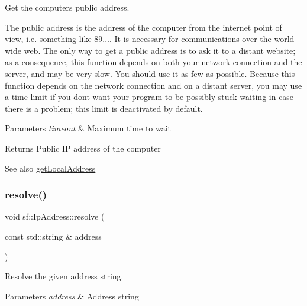 Get the computer\textquotesingle{}s public address. 

The public address is the address of the computer from the internet point of view, i.\+e. something like 89.... It is necessary for communications over the world wide web. The only way to get a public address is to ask it to a distant website; as a consequence, this function depends on both your network connection and the server, and may be very slow. You should use it as few as possible. Because this function depends on the network connection and on a distant server, you may use a time limit if you don\textquotesingle{}t want your program to be possibly stuck waiting in case there is a problem; this limit is deactivated by default.


\begin{DoxyParams}{Parameters}
{\em timeout} & Maximum time to wait\\
\hline
\end{DoxyParams}
\begin{DoxyReturn}{Returns}
Public IP address of the computer
\end{DoxyReturn}
\begin{DoxySeeAlso}{See also}
\mbox{\hyperlink{classsf_1_1_ip_address_a4c31622ad87edca48adbb8e8ed00ee4a}{get\+Local\+Address}} \begin{DoxyVerb}\end{DoxyVerb}
 
\end{DoxySeeAlso}
\mbox{\label{classsf_1_1_ip_address_aa6e114d1a8cb977aff6132d490e4a6b1}} 
\subsubsection{\texorpdfstring{resolve()}{resolve()}}
{\footnotesize\ttfamily void sf\+::\+Ip\+Address\+::resolve (\begin{DoxyParamCaption}\item[{const std\+::string \&}]{address }\end{DoxyParamCaption})\hspace{0.3cm}{\ttfamily [private]}}



Resolve the given address string. 


\begin{DoxyParams}{Parameters}
{\em address} & Address string \begin{DoxyVerb}\end{DoxyVerb}
 \\
\hline
\end{DoxyParams}
\mbox{\label{classsf_1_1_ip_address_ae7911c5ea9562f9602c3e29cd54b15e9}} 
